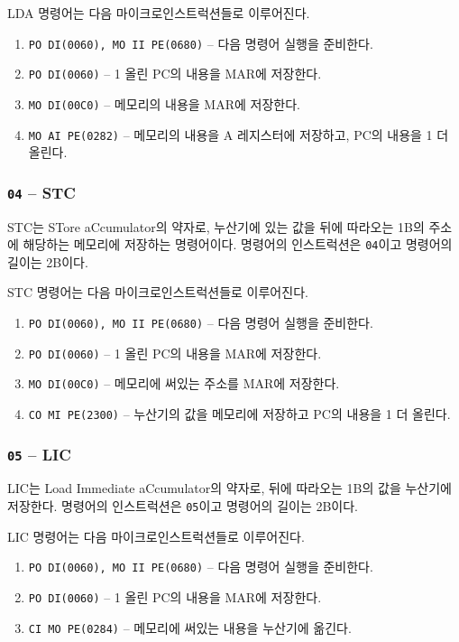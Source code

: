 \documentclass{article}
\begin{document}
LDA 명령어는 다음 마이크로인스트럭션들로 이루어진다.

\begin{enumerate}
    \item \texttt{PO DI(0060), MO II PE(0680)} -- 다음 명령어 실행을 준비한다.
    \setcounter{enumi}{2}
    \item \texttt{PO DI(0060)} -- 1 올린 PC의 내용을 MAR에 저장한다.
    \item \texttt{MO DI(00C0)} -- 메모리의 내용을 MAR에 저장한다.
    \item \texttt{MO AI PE(0282)} -- 메모리의 내용을 A 레지스터에 저장하고,
        PC의 내용을 1 더 올린다.
\end{enumerate}

\subsubsection{\texttt{04} -- STC}

STC는 STore aCcumulator의 약자로, 누산기에 있는 값을
뒤에 따라오는 1B의 주소에 해당하는 메모리에 저장하는 명령어이다.
명령어의 인스트럭션은 \texttt{04}이고 명령어의 길이는 2B이다.

STC 명령어는 다음 마이크로인스트럭션들로 이루어진다.

\begin{enumerate}
    \item \texttt{PO DI(0060), MO II PE(0680)} -- 다음 명령어 실행을 준비한다.
    \setcounter{enumi}{2}
    \item \texttt{PO DI(0060)} -- 1 올린 PC의 내용을 MAR에 저장한다.
    \item \texttt{MO DI(00C0)} -- 메모리에 써있는 주소를 MAR에 저장한다.
    \item \texttt{CO MI PE(2300)} -- 누산기의 값을 메모리에 저장하고
        PC의 내용을 1 더 올린다.
\end{enumerate}

\subsubsection{\texttt{05} -- LIC}

LIC는 Load Immediate aCcumulator의 약자로,
뒤에 따라오는 1B의 값을 누산기에 저장한다.
명령어의 인스트럭션은 \texttt{05}이고 명령어의 길이는 2B이다.

LIC 명령어는 다음 마이크로인스트럭션들로 이루어진다.

\begin{enumerate}
    \item \texttt{PO DI(0060), MO II PE(0680)} -- 다음 명령어 실행을 준비한다.
    \setcounter{enumi}{2}
    \item \texttt{PO DI(0060)} -- 1 올린 PC의 내용을 MAR에 저장한다.
    \item \texttt{CI MO PE(0284)} -- 메모리에 써있는 내용을 누산기에 옮긴다.
\end{enumerate}
\end{document}
